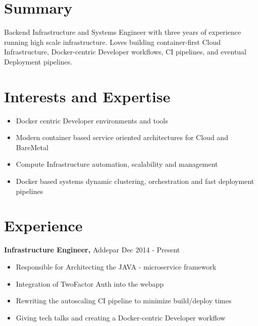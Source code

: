 \documentclass[margin]{res}
\begin{document}

\address{ \textbf{phone}:\hspace{1mm}\href{http://ankush.io/}{+1~(669)~400~9729}\hspace{5mm} \textbf{Github}:\hspace{1mm}\href{https://github.com/akshay-agarwal}{akshay-agarwal}\hspace{5mm}      \textbf{Email}:\hspace{1mm}\href{mailto:akshay.agwl@gmail.com}{akshay.agwl@gmail.com} }

\begin{resume}

\section{Summary}

  Backend Infrastructure and Systems Engineer with three years of experience running high scale infrastructure. Loves building container-first Cloud Infrastructure, Docker-centric Developer workflows, CI pipelines, and eventual Deployment pipelines.


\section{Interests and Expertise}
 \begin{itemize} \itemsep -2pt  %
  \item Docker centric Developer environments and tools 
 \item Modern container based service oriented architectures for Cloud and BareMetal
 \item Compute Infrastructure automation, scalability and management
 \item Docker based systems dynamic clustering, orchestration and fast deployment pipelines
 \end{itemize}

\section{Experience}
 {\bf Infrastructure Engineer,} Addepar \hfill Dec  2014  - Present
 \begin{itemize} \itemsep -2pt  %
 \item Responsible for Architecting the JAVA - microservice framework
 \item Integration of TwoFactor Auth into the webapp
 \item Rewriting the autoscaling CI pipeline to minimize build/deploy times
 \item Giving tech talks and creating a Docker-centric Developer workflow
 \end{itemize}


\end{resume}
\end{document}
